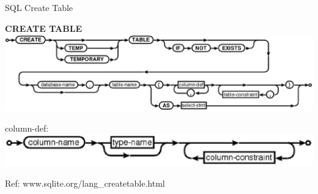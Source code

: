 \documentclass{beamer}
\begin{document}
\begin{frame}{SQL Create Table} \scriptsize


{\bf CREATE TABLE} \\
\vspace{4pt} \includegraphics[scale=0.35]{create-table-stmt.eps}

\scriptsize column-def: \\
\vspace{4pt} \includegraphics[scale=0.4]{column-def.eps}


{\vspace{6pt} \tiny Ref: www.sqlite.org/lang\_createtable.html} 


\end{frame}
\end{document}
